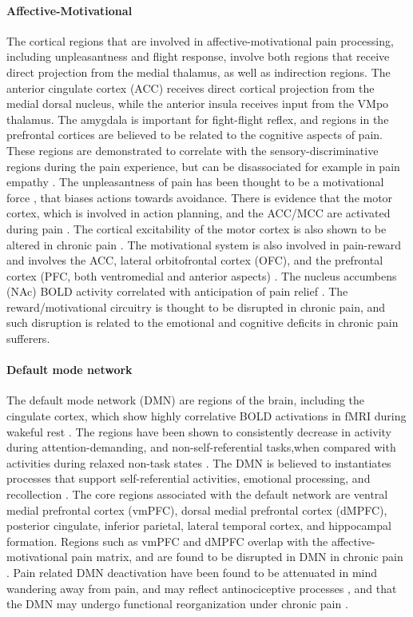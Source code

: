 \paragraph{Affective-Motivational}
The cortical regions that are involved in affective-motivational pain processing, including unpleasantness and flight response, involve both regions that receive direct projection from the medial thalamus, as well as indirection regions. The anterior cingulate cortex (ACC) receives direct cortical projection from the medial dorsal nucleus, while the anterior insula receives input from the VMpo thalamus. The amygdala is important for fight-flight reflex, and regions in the prefrontal cortices are believed to be related to the cognitive aspects of pain. These regions are demonstrated to correlate with the sensory-discriminative regions during the pain experience, but can be disassociated for example in pain empathy \cite{Singer2004}. The unpleasantness of pain has been thought to be a motivational force \cite{Auvray2010}, that biases actions towards avoidance. There is evidence that the motor cortex, which is involved in action planning, and the ACC/MCC are activated during pain \cite{Parker2016,Burns2016,Erpelding2013}. The cortical excitability of the motor cortex is also shown to be altered in chronic pain \cite{Parker2016}. The motivational system is also involved in pain-reward and involves the ACC, lateral orbitofrontal cortex (OFC), and the prefrontal cortex (PFC, both ventromedial and anterior aspects) \cite{Navratilova2015}. The nucleus accumbens (NAc) BOLD activity correlated with anticipation of pain relief \cite{Baliki2010}. The reward/motivational circuitry is thought to be disrupted in chronic pain, and such disruption is related to the emotional and cognitive deficits in chronic pain sufferers.

\paragraph{Default mode network}
The default mode network (DMN) are regions of the brain, including the cingulate cortex, which show highly correlative BOLD activations in fMRI during wakeful rest \cite{Greicius2003,Raichle2015}. The regions have been shown to consistently decrease in activity during attention-demanding, and non-self-referential tasks,when compared with activities during relaxed non-task states \cite{Raichle2015}. The DMN is believed to instantiates processes that support self-referential activities, emotional processing, and recollection \cite{Raichle2015}. The core regions associated with the default network are ventral medial prefrontal cortex (vmPFC), dorsal medial prefrontal cortex (dMPFC), posterior cingulate, inferior parietal, lateral temporal cortex, and hippocampal formation. Regions such as vmPFC and dMPFC overlap with the affective-motivational pain matrix, and are found to be disrupted in DMN in chronic pain \cite{Baliki2008}. Pain related DMN deactivation have been found to be attenuated  in mind wandering away from pain, and may reflect antinociceptive processes \cite{Kucyi2013}, and that the DMN may undergo functional reorganization under chronic pain \cite{Baliki2014}. 

